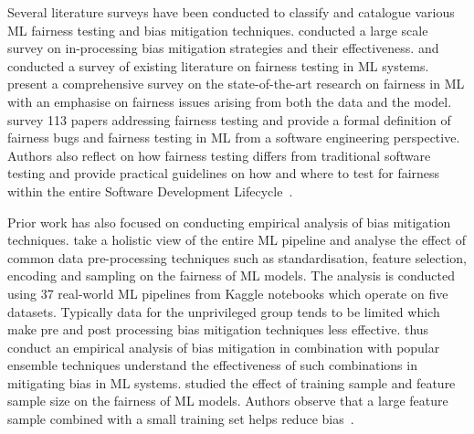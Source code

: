 \documentclass{article}
\begin{document}
Several literature surveys have been conducted to classify and
catalogue various ML fairness testing and bias mitigation techniques.
\citeauthor{wan2021modeling} conducted a large scale survey on
in-processing bias mitigation strategies and their effectiveness.
\citeauthor{chen2022fairness} and \citeauthor{mehrabi2021survey}
conducted a survey of existing literature on fairness testing in ML
systems. \citeauthor{mehrabi2021survey} present a comprehensive survey
on the state-of-the-art research on fairness in ML with an emphasise
on fairness issues arising from both the data and the model.
\citeauthor{chen2022fairness} survey 113 papers addressing fairness
testing and provide a formal definition of fairness bugs and fairness
testing in ML from a software engineering perspective. Authors also reflect on how
fairness testing differs from traditional software testing and provide
practical guidelines on how and where to test for fairness within the
entire Software Development
Lifecycle \cite{wan2021modeling,chen2022fairness,mehrabi2021survey}.

Prior work has also focused on conducting empirical analysis of bias
mitigation techniques. \citeauthor{biswas2021fair} take a holistic
view of the entire ML pipeline and analyse the effect of common data
pre-processing techniques such as standardisation, feature selection,
encoding and sampling on the fairness of ML models. The analysis is
conducted using 37 real-world ML pipelines from Kaggle notebooks which
operate on five datasets. Typically data for the unprivileged group
tends to be limited which make pre and post processing bias mitigation
techniques less effective. \citeauthor{feffer2022empirical} thus
conduct an empirical analysis of bias mitigation in combination with
popular ensemble techniques understand the effectiveness of such
combinations in mitigating bias in ML
systems. \citeauthor{zhang2021ignorance} studied the effect of
training sample and feature sample size on the fairness of ML
models. Authors observe that a large feature sample combined with
a small training set helps reduce
bias \cite{biswas2021fair,feffer2022empirical,zhang2021ignorance}.
\end{document}
